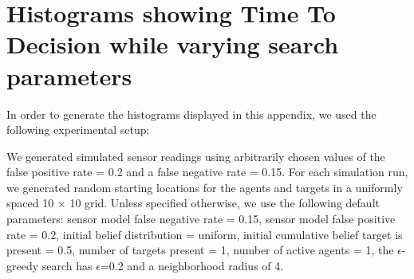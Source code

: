 
\chapter{Histograms showing Time To Decision while varying search parameters} \label{chap:AppendixTwo}

In order to generate the histograms displayed in this appendix, we used the following experimental setup:\par
We generated simulated sensor readings using arbitrarily chosen values of the false positive rate = 0.2 and a false negative rate = 0.15. For each simulation run, we generated random starting locations for the agents and targets in a uniformly spaced 10 $\times$ 10 grid. Unless specified otherwise, we use the following default parameters: sensor model false negative rate = 0.15, sensor model false positive rate = 0.2, initial belief distribution = uniform, initial cumulative belief target is present = 0.5, number of targets present = 1, number of active agents = 1, the $\epsilon$-greedy search has $\epsilon$=0.2 and a neighborhood radius of 4.

